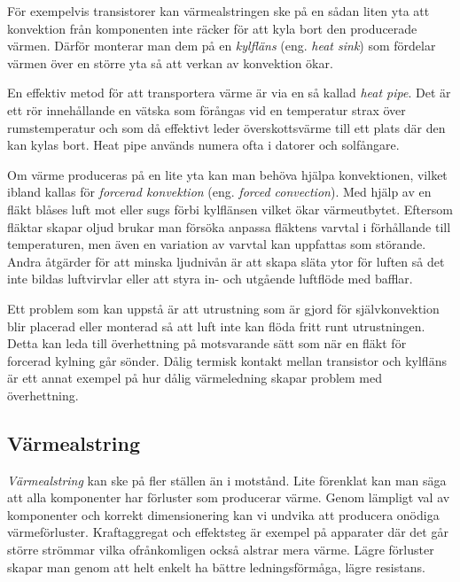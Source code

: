 För exempelvis transistorer kan värmealstringen ske på en sådan liten yta att
konvektion från komponenten inte räcker för att kyla bort den producerade
värmen. Därför monterar man dem på en \emph{kylfläns} (eng. \emph{heat sink})
som fördelar värmen över en större yta så att verkan av konvektion ökar.

En effektiv metod för att transportera värme är via en så kallad \emph{heat
  pipe}. Det är ett rör innehållande en vätska som förångas vid en temperatur
strax över rumstemperatur och som då effektivt leder överskottsvärme till ett
plats där den kan kylas bort. Heat pipe används numera ofta i datorer och
solfångare.


Om värme produceras på en lite yta kan man behöva hjälpa konvektionen, vilket
ibland kallas för \emph{forcerad konvektion} (eng. \emph{forced convection}).
Med hjälp av en fläkt blåses luft mot eller sugs förbi kylflänsen vilket ökar
värmeutbytet. Eftersom fläktar skapar oljud brukar man försöka anpassa fläktens
varvtal i förhållande till temperaturen, men även en variation av varvtal kan
uppfattas som störande. Andra åtgärder för att minska ljudnivån är att skapa
släta ytor för luften så det inte bildas luftvirvlar eller att styra in- och
utgående luftflöde med bafflar.

Ett problem som kan uppstå är att utrustning som är gjord för självkonvektion
blir placerad eller monterad så att luft inte kan flöda fritt runt
utrustningen. Detta kan leda till överhettning på motsvarande sätt som när
en fläkt för forcerad kylning går sönder. Dålig termisk kontakt mellan
transistor och kylfläns är ett annat exempel på hur dålig värmeledning skapar
problem med överhettning.

\subsection{Värmealstring}

\emph{Värmealstring} kan ske på fler ställen än i motstånd. Lite förenklat
kan man säga att alla komponenter har förluster som producerar värme. Genom
lämpligt val av komponenter och korrekt dimensionering kan vi undvika att
producera onödiga värmeförluster. Kraftaggregat och effektsteg är exempel
på apparater där det går större strömmar vilka ofrånkomligen också alstrar
mera värme. Lägre förluster skapar man genom att helt enkelt ha bättre
ledningsförmåga, lägre resistans.

